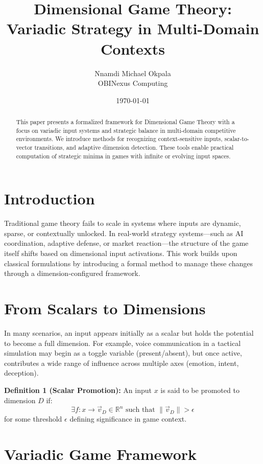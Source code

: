 \documentclass[12pt]{article}
\title{Dimensional Game Theory: Variadic Strategy in Multi-Domain Contexts}
\author{Nnamdi Michael Okpala \\ OBINexus Computing}
\date{\today}
\begin{document}
\maketitle

\begin{abstract}
This paper presents a formalized framework for Dimensional Game Theory with a focus on variadic input systems and strategic balance in multi-domain competitive environments. We introduce methods for recognizing context-sensitive inputs, scalar-to-vector transitions, and adaptive dimension detection. These tools enable practical computation of strategic minima in games with infinite or evolving input spaces.
\end{abstract}

\section{Introduction}
Traditional game theory fails to scale in systems where inputs are dynamic, sparse, or contextually unlocked. In real-world strategy systems—such as AI coordination, adaptive defense, or market reaction—the structure of the game itself shifts based on dimensional input activations. This work builds upon classical formulations by introducing a formal method to manage these changes through a dimension-configured framework.

\section{From Scalars to Dimensions}
In many scenarios, an input appears initially as a scalar but holds the potential to become a full dimension. For example, voice communication in a tactical simulation may begin as a toggle variable (present/absent), but once active, contributes a wide range of influence across multiple axes (emotion, intent, deception).

\textbf{Definition 1 (Scalar Promotion):} An input $x$ is said to be promoted to dimension $D$ if:
\begin{equation}
\exists f: x \rightarrow \vec{v}_D \in \mathbb{R}^n \text{ such that } \|\vec{v}_D\| > \epsilon
\end{equation}
for some threshold $\epsilon$ defining significance in game context.

\section{Variadic Game Framework}
\end{document}
